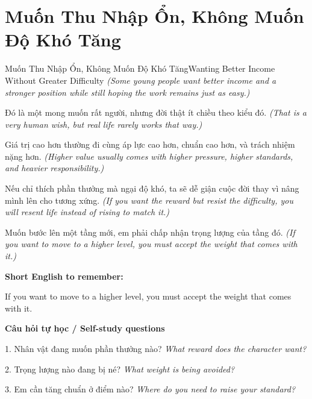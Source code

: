 \section{Muốn Thu Nhập Ổn, Không Muốn Độ Khó Tăng}
\begin{truyen}{Muốn Thu Nhập Ổn, Không Muốn Độ Khó Tăng}{Wanting Better Income Without Greater Difficulty}
\textit{(Some young people want better income and a stronger position while still hoping the work remains just as easy.)}

Đó là một mong muốn rất người, nhưng đời thật ít chiều theo kiểu đó.
\textit{(That is a very human wish, but real life rarely works that way.)}

Giá trị cao hơn thường đi cùng áp lực cao hơn, chuẩn cao hơn, và trách nhiệm nặng hơn.
\textit{(Higher value usually comes with higher pressure, higher standards, and heavier responsibility.)}

Nếu chỉ thích phần thưởng mà ngại độ khó, ta sẽ dễ giận cuộc đời thay vì nâng mình lên cho tương xứng.
\textit{(If you want the reward but resist the difficulty, you will resent life instead of rising to match it.)}

\end{truyen}

\begin{baihoc}
Muốn bước lên một tầng mới, em phải chấp nhận trọng lượng của tầng đó.
\textit{(If you want to move to a higher level, you must accept the weight that comes with it.)}
\end{baihoc}

\begin{ghinhoanh}
\textbf{Short English to remember:}

If you want to move to a higher level, you must accept the weight that comes with it.

\end{ghinhoanh}

\begin{tuhocnhanh}
\textbf{Câu hỏi tự học / Self-study questions}

1. Nhân vật đang muốn phần thưởng nào? \textit{What reward does the character want?}

2. Trọng lượng nào đang bị né? \textit{What weight is being avoided?}

3. Em cần tăng chuẩn ở điểm nào? \textit{Where do you need to raise your standard?}
\end{tuhocnhanh}
\ngancach

